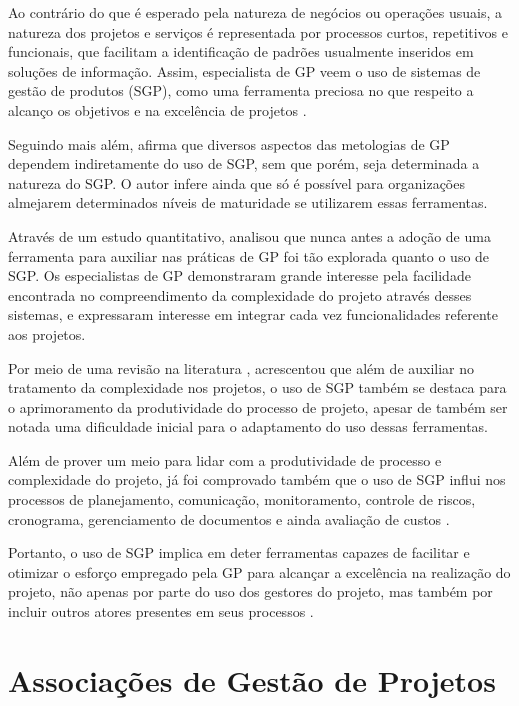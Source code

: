   Ao contrário do que é esperado pela natureza de negócios ou operações usuais, a natureza dos projetos e serviços é representada por processos curtos, repetitivos e funcionais, que facilitam a identificação de padrões usualmente inseridos em soluções de informação. Assim, especialista de GP veem o uso de sistemas de gestão de produtos (SGP), como uma ferramenta preciosa no que respeito a alcanço os objetivos e na excelência de projetos \cite{cserban2011project}.

  Seguindo mais além,  afirma que diversos aspectos das metologias de GP dependem indiretamente do uso de SGP, sem que porém, seja determinada a natureza do SGP. O autor infere ainda que só é possível para organizações almejarem determinados níveis de maturidade se utilizarem essas ferramentas.

  Através de um estudo quantitativo,  analisou que nunca antes a adoção de uma ferramenta para auxiliar nas práticas de GP foi tão explorada quanto o uso de SGP. Os especialistas de GP demonstraram grande interesse pela facilidade encontrada no compreendimento da complexidade do projeto através desses sistemas, e expressaram interesse em integrar cada vez funcionalidades referente aos projetos.

  Por meio de uma revisão na literatura , acrescentou que além de auxiliar no tratamento da complexidade nos projetos, o uso de SGP também se destaca para o aprimoramento da produtividade do processo de projeto, apesar de também ser notada uma dificuldade inicial para o adaptamento do uso dessas ferramentas.

  Além de prover um meio para lidar com a produtividade de processo e complexidade do projeto, já foi comprovado também que o uso de SGP influi nos processos de planejamento, comunicação, monitoramento, controle de riscos, cronograma, gerenciamento de documentos e ainda avaliação de custos \cite{raymond2008project}.

  Portanto, o uso de SGP implica em deter ferramentas capazes de facilitar e otimizar o esforço empregado pela GP para alcançar a excelência na realização do projeto, não apenas por parte do uso dos gestores do projeto, mas também por incluir outros atores presentes em seus processos \cite{cserban2011project}.

\section{Associações de Gestão de Projetos}

